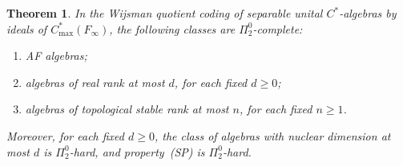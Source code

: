 \documentclass[12pt,fleqn,a4paper]{amsart}
\renewcommand{\ge}{\geqslant}
\numberwithin{equation}{section}
\newtheorem{theorem}{Theorem}[section]
\theoremstyle{definition}
\begin{document}
\begin{theorem}\label{thm:Cstar-Pi2-complete}
In the Wijsman quotient coding of separable unital $C^*$-algebras by ideals of
$C^*_{\max}(F_\infty)$, the following classes are $\Pi^0_2$-complete:
\begin{enumerate}
\item AF algebras;
\item algebras of real rank at most $d$, for each fixed $d\ge0$;
\item algebras of topological stable rank at most $n$, for each fixed $n\ge1$.
\end{enumerate}
Moreover, for each fixed $d\ge0$, the class of algebras with nuclear dimension at most
$d$ is $\Pi^0_2$-hard, and property~\textup{(SP)} is $\Pi^0_2$-hard.
\end{theorem}
\end{document}
